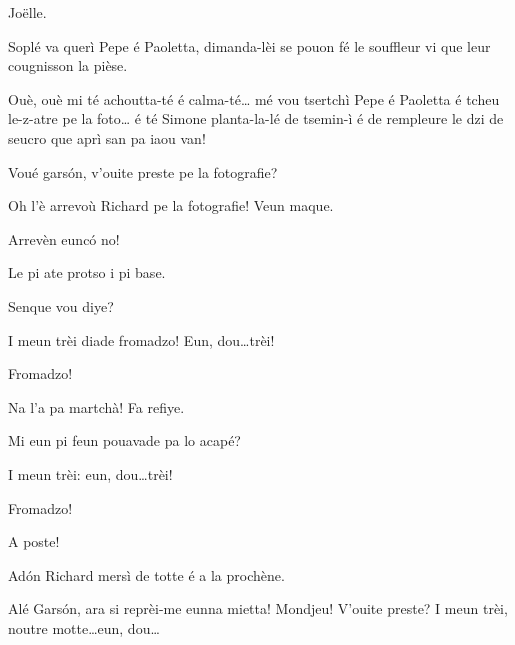 \begin{drama}
\Joellespeaks Jo\"{e}lle.

\Cimaspeaks Soplé va querì Pepe é Paoletta, dimanda-lèi se pouon fé le souffleur vi que leur cougnisson la pièse.

\Joellespeaks Ouè, ouè mi té achoutta-té é calma-té\ldots {} mé vou tsertchì Pepe é Paoletta é tcheu le-z-atre pe la foto\ldots {} é té Simone planta-la-lé de tsemin-ì é de rempleure le dzi de seucro que aprì san pa iaou van!


\Fotografespeaks Voué gars\'on, v'ouite preste pe la fotografie?

\Joelspeaks Oh l'è arrevoù Richard pe la fotografie! Veun maque.

\Joellespeaks {} Arrevèn euncó no!


\Fotografespeaks Le pi ate protso i pi base.

\Joelspeaks Senque vou diye?

\Fotografespeaks I meun trèi diade fromadzo! Eun, dou\ldots trèi!

\Tcheuttespeaks {} Fromadzo!

\Fotografespeaks Na l'a pa martchà! Fa refiye.

\Cimaspeaks Mi eun pi feun pouavade pa lo acapé?

\Fotografespeaks I meun trèi: eun, dou\ldots trèi!

\Tcheuttespeaks {} Fromadzo!

\Fotografespeaks A poste!


\Joelspeaks Ad\'on Richard mersì de totte é a la prochène.


\Joelspeaks Alé Gars\'on, ara si reprèi-me eunna mietta! Mondjeu! V'ouite preste? I meun trèi, noutre motte\ldots eun, dou\ldots


\end{drama}
